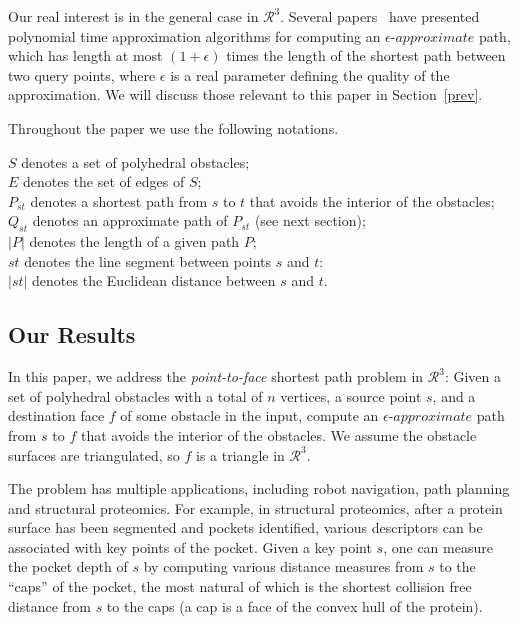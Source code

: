 \documentclass{llncs}
\begin{document}
Our real interest is in the general case in $\mathcal{R}^3$.
Several papers~\cite{Pap85,Clar87,Sar99} have presented polynomial time
approximation algorithms for computing an $\epsilon$-$approximate$ path, which has length at
most $(1+\epsilon)$ times the length of the shortest path between two query points,
where $\epsilon$ is a real parameter defining the quality of the approximation.
We will discuss those relevant to this paper in Section~\ref{prev}.

Throughout the paper we use the following notations.

\begin{tabbing}
$S$ denotes a set of polyhedral obstacles;\\
$E$ denotes the set of edges of $S$;\\
$P_{st}$ denotes a shortest path from $s$ to $t$ that avoids the interior of the obstacles; \\
$Q_{st}$ denotes an approximate path of $P_{st}$ (see next section); \\
$|P|$ denotes the length of a given path $P$; \\
$st$ denotes the line segment between points $s$ and $t$:\\
$|st|$ denotes the Euclidean distance between $s$ and $t$.\\
\end{tabbing}

\subsection{Our Results}

In this paper, we address the {\em point-to-face} shortest path problem in $\mathcal{R}^3$:
Given a set of polyhedral obstacles with a total of $n$ vertices, a source point $s$, and a destination
face $f$ of some obstacle in the input, compute an $\epsilon$-$approximate$ path from $s$ to $f$ that
avoids the interior of the obstacles.
We assume the obstacle surfaces are triangulated, so $f$ is a triangle in $\mathcal{R}^3$.


The problem has multiple applications, including robot navigation, path planning and
structural proteomics.
For example, in structural proteomics, after a protein surface has been segmented and pockets identified,
various descriptors can be associated
with key points of the pocket. Given a key point $s$, one can measure the pocket depth of $s$ by
computing various distance measures from
$s$ to the ``caps'' of the pocket, the most natural of which is the shortest collision free
distance from $s$ to the caps (a cap is a face of the convex hull of the protein).
\end{document}
